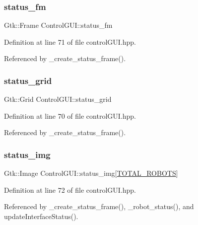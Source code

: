 \subsubsection{\texorpdfstring{status\+\_\+fm}{status\_fm}}
{\footnotesize\ttfamily Gtk\+::\+Frame Control\+G\+U\+I\+::status\+\_\+fm}



Definition at line 71 of file control\+G\+U\+I.\+hpp.



Referenced by \+\_\+create\+\_\+status\+\_\+frame().

\mbox{\label{class_control_g_u_i_a9540bafb29ed9fb1c563a92a65617f10}} 
\subsubsection{\texorpdfstring{status\+\_\+grid}{status\_grid}}
{\footnotesize\ttfamily Gtk\+::\+Grid Control\+G\+U\+I\+::status\+\_\+grid}



Definition at line 70 of file control\+G\+U\+I.\+hpp.



Referenced by \+\_\+create\+\_\+status\+\_\+frame().

\mbox{\label{class_control_g_u_i_ac62b21acfde0d36a37b9838a00432295}} 
\subsubsection{\texorpdfstring{status\+\_\+img}{status\_img}}
{\footnotesize\ttfamily Gtk\+::\+Image Control\+G\+U\+I\+::status\+\_\+img\mbox{[}\hyperlink{class_control_g_u_i_a5a2c1a15c09444b56794705721ba73fa}{T\+O\+T\+A\+L\+\_\+\+R\+O\+B\+O\+TS}\mbox{]}}



Definition at line 72 of file control\+G\+U\+I.\+hpp.



Referenced by \+\_\+create\+\_\+status\+\_\+frame(), \+\_\+robot\+\_\+status(), and update\+Interface\+Status().

\mbox{\label{class_control_g_u_i_a99da3a90036061b9ab84323de2ae3bcf}} 
